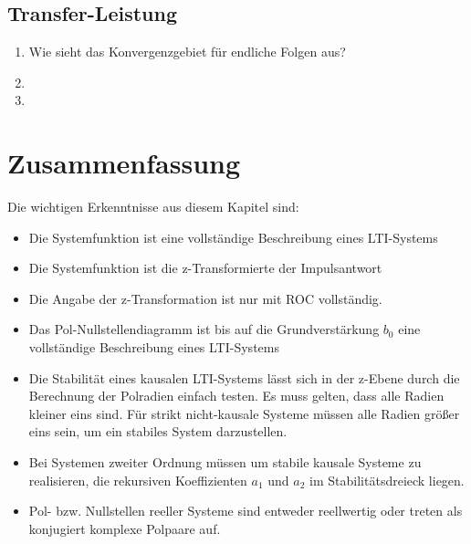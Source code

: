 \subsection{Transfer-Leistung}
\begin{enumerate}
    \item Wie sieht das Konvergenzgebiet für endliche Folgen aus?
    \item
    \item
\end{enumerate}
%
{
\section{Zusammenfassung}
Die wichtigen Erkenntnisse aus diesem Kapitel sind:
\begin{itemize}
    \item Die Systemfunktion ist eine vollständige Beschreibung eines LTI-Systems
    \item Die Systemfunktion ist die z-Transformierte der Impulsantwort
    \item Die Angabe der z-Transformation ist nur mit ROC vollständig.
    \item Das Pol-Nullstellendiagramm ist bis auf die Grundverstärkung $b_0$ eine
    vollständige Beschreibung eines LTI-Systems
    \item Die Stabilität eines kausalen LTI-Systems lässt sich
in der z-Ebene durch die Berechnung der Polradien einfach testen. Es muss gelten, dass
alle Radien kleiner eins sind. Für strikt nicht-kausale Systeme müssen alle Radien größer eins sein, um
ein stabiles System darzustellen.
    \item Bei Systemen zweiter Ordnung müssen um stabile kausale Systeme zu realisieren,
    die rekursiven Koeffizienten $a_1$ und $a_2$ im
    Stabilitätsdreieck liegen.
    \item Pol- bzw. Nullstellen reeller Systeme sind entweder reellwertig oder treten als
    konjugiert komplexe Polpaare auf.
\end{itemize}

}
